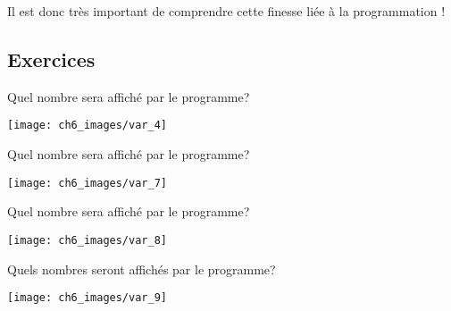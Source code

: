 \documentclass[11pt, a4paper]{book}
\begin{document}
Il est donc très important de comprendre cette finesse liée à la programmation !

\subsection*{Exercices}

\begin{exercice}
Quel nombre sera affiché par le programme?
\begin{center}
\texttt{[image: ch6\_images/var\_4]}
\end{center}
\end{exercice}

\begin{exercice}
Quel nombre sera affiché par le programme?
\begin{center}
\texttt{[image: ch6\_images/var\_7]}
\end{center}
\end{exercice}

\begin{exercice}
Quel nombre sera affiché par le programme?
\begin{center}
\texttt{[image: ch6\_images/var\_8]}
\end{center}
\end{exercice}



\begin{exercice}
Quels nombres seront affichés par le programme?
\begin{center}
\texttt{[image: ch6\_images/var\_9]}
\end{center}
\end{exercice}




\end{document}
